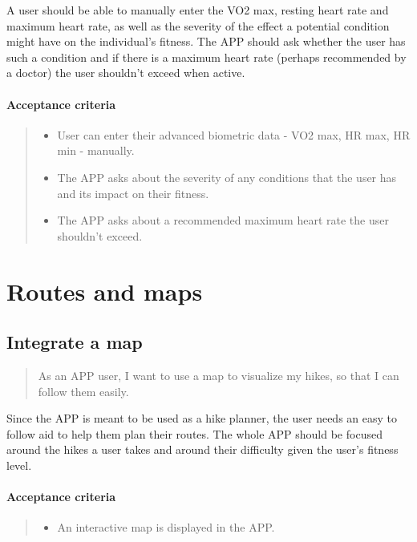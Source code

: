 A user should be able to manually enter the VO2 max, resting heart rate and maximum heart rate, as well as the severity of the effect a potential condition might have on the individual's fitness.
The APP should ask whether the user has such a condition and if there is a maximum heart rate (perhaps recommended by a doctor) the user shouldn't exceed when active.

\paragraph*{Acceptance criteria}
\begin{quote}
\begin{itemize}
    \item User can enter their advanced biometric data - VO2 max, HR max, HR min - manually.
    \item The APP asks about the severity of any conditions that the user has and its impact on their fitness.
    \item The APP asks about a recommended maximum heart rate the user shouldn't exceed.
\end{itemize}
\end{quote}


\section{Routes and maps}\label{epic:map}

\subsection{Integrate a map}\label{US:map-integrate}
\begin{quote}
As an APP user, I want to use a map to visualize my hikes, so that I can follow them easily.
\end{quote}

Since the APP is meant to be used as a hike planner, the user needs an easy to follow aid to help them plan their routes.
The whole APP should be focused around the hikes a user takes and around their difficulty given the user's fitness level.

\paragraph*{Acceptance criteria}
\begin{quote}
\begin{itemize}
    \item An interactive map is displayed in the APP.
\end{itemize}
\end{quote}

